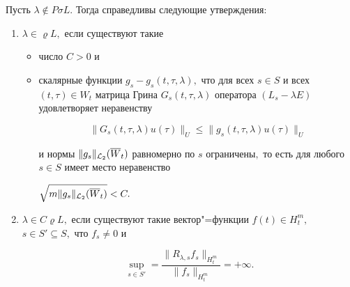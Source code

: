 \smallskip



\hypertarget{korn:th:3}{}



\begin{theorem}[3]Пусть $\lambda\notin P\sigma L.$ Тогда справедливы следующие утверждения\/{\rm:}

\begin{enumerate}

\item[\rm 1)] $\lambda\in\varrho L,$  если существуют такие 

\begin{itemize}

\item [а$)$] число $C>0$ и 

\item [б$)$] скалярные функции $g_s-g_s(t,\tau,\lambda),$  что для всех $s\in S$ и всех $(t,\tau)\in W_t$ матрица Грина $G_s(t,\tau,\lambda)$ оператора $(L_s-\lambda E)$ удовлетворяет неравенству

$$

\bigl\| {G_s (t,\tau ,\lambda )u(\tau )} \bigr\|_U \le 

\bigl\| {g_s (t,\tau  ,\lambda )u(\tau )} \bigr\|_U 

$$

и нормы $\|g_s\|_{{\cal L}_2}(\overline W_t)$ равномерно по $s$ ограничены$,$ то есть для любого $s\in S$ имеет место неравенство 

$\sqrt{ m \|g_s\|_{{\cal L}_2}(\overline W_t)}<C.$



\end{itemize}





\item[\rm 2)] $\lambda\in C\varrho L,$ если существуют такие вектор"=функции $f(t)\in H_t^m,$ $s\in S'\subseteq S,$ что $f_s\ne0$ и

\begin{equation}

\label{kor:eq10}

\sup\limits_{s\in S'}=\frac{\|R_{\lambda,s}f_s\|_{H_t^m}}{\|f_s\|_{H_t^m}}=+\infty.

\end{equation}

\end{enumerate}

\end{theorem}



